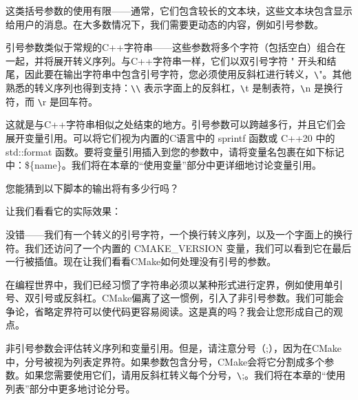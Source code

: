 这类括号参数的使用有限——通常，它们包含较长的文本块，这些文本块包含显示给用户的消息。在大多数情况下，我们需要更动态的内容，例如引号参数。


引号参数类似于常规的C++字符串——这些参数将多个字符（包括空白）组合在一起，并将展开转义序列。与C++字符串一样，它们以双引号字符 " 开头和结尾，因此要在输出字符串中包含引号字符，您必须使用反斜杠进行转义，\verb|\|"。其他熟悉的转义序列也得到支持：\verb|\\| 表示字面上的反斜杠，\verb|\|t 是制表符，\verb|\|n 是换行符，而 \verb|\|r 是回车符。

这就是与C++字符串相似之处结束的地方。引号参数可以跨越多行，并且它们会展开变量引用。可以将它们视为内置的C语言中的 sprintf 函数或 C++20 中的 std::format 函数。要将变量引用插入到您的参数中，请将变量名包裹在如下标记中：\$\{name\}。我们将在本章的“使用变量”部分中更详细地讨论变量引用。

您能猜到以下脚本的输出将有多少行吗？



让我们看看它的实际效果：


没错——我们有一个转义的引号字符，一个换行转义序列，以及一个字面上的换行符。我们还访问了一个内置的 CMAKE\_VERSION 变量，我们可以看到它在最后一行被插值。现在让我们看看CMake如何处理没有引号的参数。


在编程世界中，我们已经习惯了字符串必须以某种形式进行定界，例如使用单引号、双引号或反斜杠。CMake偏离了这一惯例，引入了非引号参数。我们可能会争论，省略定界符可以使代码更容易阅读。这是真的吗？我会让您形成自己的观点。

非引号参数会评估转义序列和变量引用。但是，请注意分号（;），因为在CMake中，分号被视为列表定界符。如果参数包含分号，CMake会将它分割成多个参数。如果您需要使用它们，请用反斜杠转义每个分号，\verb|\|;。我们将在本章的“使用列表”部分中更多地讨论分号。

